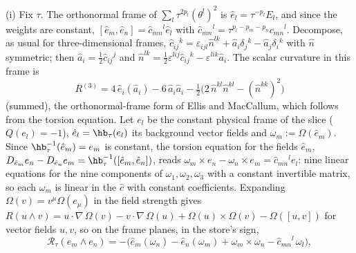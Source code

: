 (i) Fix $\tau$. The orthonormal frame of $\sum_{l}\tau^{2p_{l}}(\theta^{l})^{2}$ is $\hat e_{l} = \tau^{-p_{l}}E_{l}$, and since the weights are constant, $[\hat e_{m}, \hat e_{n}] = \hat c_{mn}{}^{l}\hat e_{l}$ with $\hat c_{mn}{}^{l} = \tau^{p_{l} - p_{m} - p_{n}}c_{mn}{}^{l}$. Decompose, as usual for three-dimensional frames, $\hat c_{ij}{}^{k} = \varepsilon_{ijl}\hat n^{lk} + \hat a_{i}\delta_{j}{}^{k} - \hat a_{j}\delta_{i}{}^{k}$ with $\hat n$ symmetric; then $\hat a_{i} = \tfrac12\hat c_{ij}{}^{j}$ and $\hat n^{lk} = \tfrac12\varepsilon^{lij}\hat c_{ij}{}^{k} - \varepsilon^{lik}\hat a_{i}$. The scalar curvature in this frame is
\[
R^{(3)} = 4\,\hat e_{i}(\hat a_{i}) - 6\,\hat a_{i}\hat a_{i} - \tfrac12\bigl(2\,\hat n^{kl}\hat n^{kl} - (\hat n^{kk})^{2}\bigr)
\]
(summed), the orthonormal-frame form of Ellis and MacCallum, which follows from the torsion equation. Let $e_{l}$ be the constant physical frame of the slice ($Q(e_{l}) = -1$), $\hat e_{l} = \hb_{\tau}(e_{l})$ its background vector fields and $\omega_{m} := \Omega(\hat e_{m})$. Since $\hb_{\tau}^{-1}(\hat e_{m}) = e_{m}$ is constant, the torsion equation for the fields $\hat e_{m}$, $D_{\hat e_{m}}e_{n} - D_{\hat e_{n}}e_{m} = \hb_{\tau}^{-1}([\hat e_{m}, \hat e_{n}])$, reads $\omega_{m}\times e_{n} - \omega_{n}\times e_{m} = \hat c_{mn}{}^{l}e_{l}$: nine linear equations for the nine components of $\omega_{1}, \omega_{2}, \omega_{3}$ with a constant invertible matrix, so each $\omega_{m}$ is linear in the $\hat c$ with constant coefficients. Expanding $\Omega(v) = v^{\mu}\Omega(e_{\mu})$ in the field strength gives $R(u \wedge v) = u\cdot\nabla\,\Omega(v) - v\cdot\nabla\,\Omega(u) + \Omega(u)\times\Omega(v) - \Omega([u, v])$ for vector fields $u, v$, so on the frame planes, in the store's sign,
\[
\mathcal{R}_{\tau}(e_{m}\wedge e_{n}) = -\bigl(\hat e_{m}(\omega_{n}) - \hat e_{n}(\omega_{m}) + \omega_{m}\times\omega_{n} - \hat c_{mn}{}^{l}\,\omega_{l}\bigr),
\]
